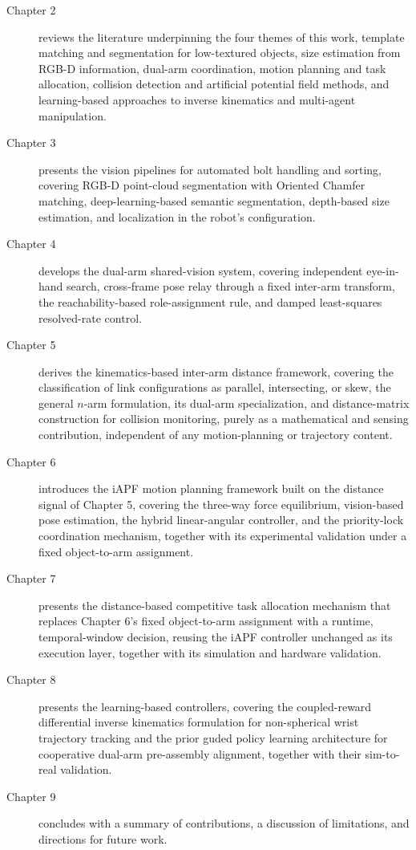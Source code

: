 \begin{description}
    \item[Chapter 2] reviews the literature underpinning the four themes of this work, template
    matching and segmentation for low-textured objects, size estimation from RGB-D information,
    dual-arm coordination, motion planning and task allocation, collision detection and artificial potential field methods, and learning-based approaches to inverse kinematics and multi-agent manipulation.

    \item[Chapter 3] presents the vision pipelines for automated bolt handling and sorting, covering
    RGB-D point-cloud segmentation with Oriented Chamfer matching, deep-learning-based semantic
    segmentation, depth-based size estimation, and localization in the robot's configuration.

    \item[Chapter 4] develops the dual-arm shared-vision system, covering independent eye-in-hand
    search, cross-frame pose relay through a fixed inter-arm transform, the reachability-based
    role-assignment rule, and damped least-squares resolved-rate control.

    \item[Chapter 5] derives the kinematics-based inter-arm distance framework, covering the
    classification of link configurations as parallel, intersecting, or skew, the general $n$-arm
    formulation, its dual-arm specialization, and distance-matrix construction for collision
    monitoring, purely as a mathematical and sensing contribution, independent of any motion-planning or trajectory content.

    \item[Chapter 6] introduces the iAPF motion planning framework built on the distance signal of
    Chapter 5, covering the three-way force equilibrium, vision-based pose estimation, the hybrid
    linear-angular controller, and the priority-lock coordination mechanism, together with its
    experimental validation under a fixed object-to-arm
    assignment.

    \item[Chapter 7] presents the distance-based competitive task allocation mechanism that replaces
    Chapter 6's fixed object-to-arm assignment with a runtime, temporal-window decision, reusing the
    iAPF controller unchanged as its execution layer, together with its simulation and hardware
    validation.

    \item[Chapter 8] presents the learning-based controllers, covering the coupled-reward
    differential inverse kinematics formulation for non-spherical wrist trajectory tracking and the
    prior guded policy learning architecture for cooperative dual-arm pre-assembly alignment,
    together with their sim-to-real validation.

    \item[Chapter 9] concludes with a summary of contributions, a discussion of limitations, and
    directions for future work.
\end{description}

